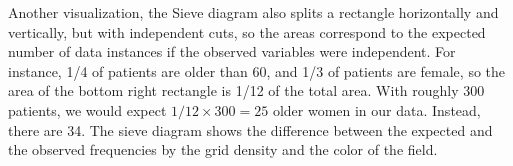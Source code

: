Another visualization, the Sieve diagram also splits a rectangle horizontally and vertically, but with independent cuts, so the areas correspond to the expected number of data instances if the observed variables were independent. For instance, 1/4 of patients are older than 60, and 1/3 of patients are female, so the area of the bottom right rectangle is 1/12 of the total area. With roughly 300 patients, we would expect $1/12 \times 300 = 25$ older women in our data. Instead, there are 34. The sieve diagram shows the difference between the expected and the observed frequencies by the grid density and the color of the field.
